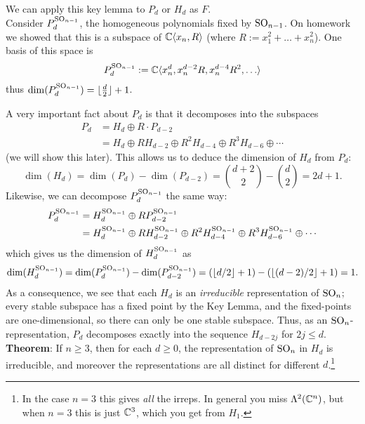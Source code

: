 \documentclass{amsart}
\begin{document}
We can apply this key lemma to $P_d$ or $H_d$ as $F$.\\

Consider $P_d^{\operatorname{SO}_{n-1}}$, the homogeneous polynomials fixed by $\operatorname{SO}_{n-1}$. On homework we showed that this is a subspace of $\mathbb{C}\langle x_n,R\rangle$ (where $R:=x_1^2+\dots+x_n^2$). One basis of this space is
$$
P_d^{\SO_{n-1}} := \C\<x_n^d,x_n^{d-2}R,x_n^{d-4}R^2,\dots\>
$$
thus $\dim(P_d^{\operatorname{SO}_{n-1}})=\lfloor \tfrac{d}{2} \rfloor + 1$. 

A very important fact about $P_d$ is that it decomposes into the subspaces
\begin{align*}
P_d &= H_d \oplus R\cdot P_{d-2}\\
&= H_d \oplus R H_{d-2} \oplus R^2 H_{d-4} \oplus R^3H_{d-6} \oplus \cdots 
\end{align*}
(we will show this later). This allows us to deduce the dimension of $H_d$ from $P_d$:
$$
\dim(H_d) = \dim(P_d) - \dim(P_{d-2}) = {d+2 \choose 2} - {d \choose 2} = 2d+1.
$$
Likewise, we can decompose $P_d^{\operatorname{SO}_{n-1}}$ the same way:
\begin{align*}
P_d^{\operatorname{SO}_{n-1}} &= H_d^{\operatorname{SO}_{n-1}} \oplus R P_{d-2}^{\operatorname{SO}_{n-1}} \\
&= H_d^{\operatorname{SO}_{n-1}} \oplus R H_{d-2}^{\operatorname{SO}_{n-1}} \oplus R^2 H_{d-4}^{\operatorname{SO}_{n-1}} \oplus R^3H_{d-6}^{\operatorname{SO}_{n-1}} \oplus \cdots 
\end{align*}
which gives us the dimension of $H_d^{\operatorname{SO}_{n-1}}$ as
$$
\dim(H_d^{\operatorname{SO}_{n-1}}) = \dim(P_d^{\operatorname{SO}_{n-1}}) - \dim(P_{d-2}^{\operatorname{SO}_{n-1}}) = (\lfloor d/2\rfloor + 1) - (\lfloor (d-2)/2\rfloor + 1) = 1.
$$
As a consequence, we see that each $H_d$ is an \textit{irreducible} representation of $\operatorname{SO}_n$; every stable subspace has a fixed point by the Key Lemma, and the fixed-points are one-dimensional, so there can only be one stable subspace. Thus, as an $\operatorname{SO}_n$-representation, $P_d$ decomposes exactly into the sequence $H_{d-2j}$ for $2j\leq d$.\\

\noindent \textbf{Theorem}: If $n\geq 3$, then for each $d\geq 0$, the representation of $\operatorname{SO}_n$ in $H_d$ is irreducible, and moreover the representations are all distinct for different $d$.\footnote{In the case $n=3$ this gives \textit{all} the irreps. In general you miss $\Lambda^2(\mathbb{C}^n)$, but when $n=3$ this is just $\mathbb{C}^3$, which you get from $H_1$.}\\
\end{document}
